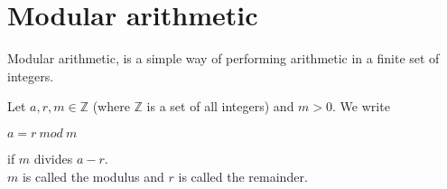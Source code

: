 \section{Modular arithmetic}
Modular arithmetic, is a simple way of performing arithmetic in a finite set of integers.

\begin{defi}
Let \begin{math} a, r,m \in  \mathbb{Z}\end{math} (where \begin{math} \mathbb{Z}\end{math} is a set of all integers) and \begin{math} m > 0\end{math}. We write  
\begin{center} \begin{math} a = r \ mod \ m\end{math} \end{center}
if \begin{math}m \end{math} divides \begin{math} a - r \end{math}.\\
\begin{math}m \end{math} is called the modulus and \begin{math}r \end{math} is called the remainder.
\end{defi}

